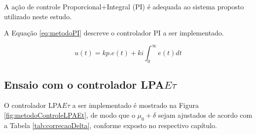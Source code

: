A ação de controle Proporcional+Integral (PI) é adequada ao sistema
proposto utilizado neste estudo.

A Equação \ref{eq:metodoPI} descreve o controlador PI a ser implementado.

\begin{equation}
  u(t) = kp.e(t) + ki \int_{0}^{\infty} e(t) dt
\label{eq:metodoPI}  
\end{equation}


\subsection{ Ensaio com o controlador LPA$E\tau$ }

O controlador LPA$E\tau$ a ser implementado é mostrado na Figura 
\ref{fig:metodoControleLPAEt}, de modo que o $\mu_0 + \delta$ sejam
ajustados de acordo com a Tabela \ref{tab:correcaoDelta}, conforme
exposto no respectivo capítulo.


